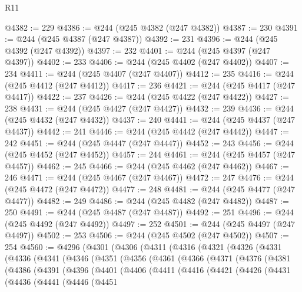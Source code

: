 \begin{lexlean}{R11}
\begin{coremodule}
{{{{{{{{{{{{{{{{{{{{{{{{{{{{{{{{{{{{{{{{{{{{{{{{{{{{{{{{{{{{{{{{{{{{{{{{{{{{{{{{{{@4382 := 229
@4386 := @244 (@245 @4382 (@247 @4382))
@4387 := 230
@4391 := @244 (@245 @4387 (@247 @4387))
@4392 := 231
@4396 := @244 (@245 @4392 (@247 @4392))
@4397 := 232
@4401 := @244 (@245 @4397 (@247 @4397))
@4402 := 233
@4406 := @244 (@245 @4402 (@247 @4402))
@4407 := 234
@4411 := @244 (@245 @4407 (@247 @4407))
@4412 := 235
@4416 := @244 (@245 @4412 (@247 @4412))
@4417 := 236
@4421 := @244 (@245 @4417 (@247 @4417))
@4422 := 237
@4426 := @244 (@245 @4422 (@247 @4422))
@4427 := 238
@4431 := @244 (@245 @4427 (@247 @4427))
@4432 := 239
@4436 := @244 (@245 @4432 (@247 @4432))
@4437 := 240
@4441 := @244 (@245 @4437 (@247 @4437))
@4442 := 241
@4446 := @244 (@245 @4442 (@247 @4442))
@4447 := 242
@4451 := @244 (@245 @4447 (@247 @4447))
@4452 := 243
@4456 := @244 (@245 @4452 (@247 @4452))
@4457 := 244
@4461 := @244 (@245 @4457 (@247 @4457))
@4462 := 245
@4466 := @244 (@245 @4462 (@247 @4462))
@4467 := 246
@4471 := @244 (@245 @4467 (@247 @4467))
@4472 := 247
@4476 := @244 (@245 @4472 (@247 @4472))
@4477 := 248
@4481 := @244 (@245 @4477 (@247 @4477))
@4482 := 249
@4486 := @244 (@245 @4482 (@247 @4482))
@4487 := 250
@4491 := @244 (@245 @4487 (@247 @4487))
@4492 := 251
@4496 := @244 (@245 @4492 (@247 @4492))
@4497 := 252
@4501 := @244 (@245 @4497 (@247 @4497))
@4502 := 253
@4506 := @244 (@245 @4502 (@247 @4502))
@4507 := 254
@4560 := @4296
    (@4301
      (@4306
        (@4311
          (@4316
            (@4321
              (@4326
                (@4331
                  (@4336
                    (@4341
                      (@4346
                        (@4351
                          (@4356
                            (@4361
                              (@4366
                                (@4371
                                  (@4376
                                    (@4381
                                      (@4386
                                        (@4391
                                          (@4396
                                            (@4401
                                              (@4406
                                                (@4411
                                                  (@4416
                                                    (@4421
                                                      (@4426
                                                        (@4431
                                                          (@4436
                                                            (@4441
                                                              (@4446
                                                                (@4451
}}}}}}}}}}}}}}}}}}}}}}}}}}}}}}}}}}}}}}}}}}}}}}}}}}}}}}}}}}}}}}}}}}}}}}}}}}}}}}}}}}
\end{coremodule}
\end{lexlean}
